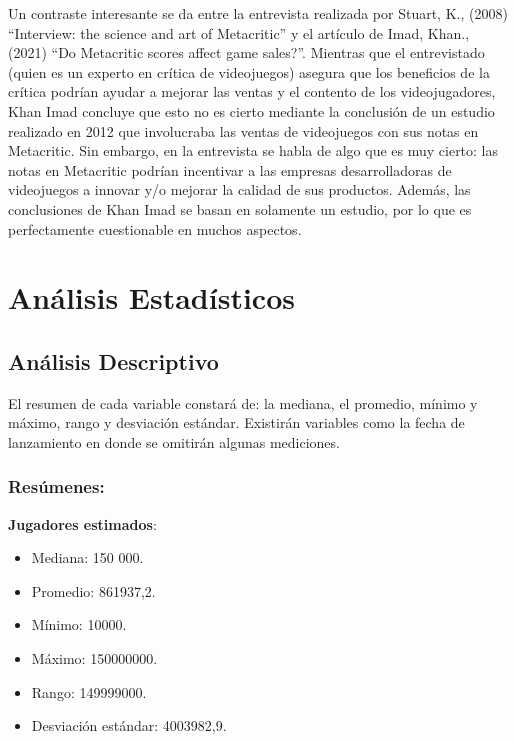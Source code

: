 \documentclass[
  letterpaper,
  DIV=11,
  numbers=noendperiod]{scrreprt}
\begin{document}
Un contraste interesante se da entre la entrevista realizada por Stuart,
K., (2008) ``Interview: the science and art of Metacritic'' y el
artículo de Imad, Khan., (2021) ``Do Metacritic scores affect game
sales?''. Mientras que el entrevistado (quien es un experto en crítica
de videojuegos) asegura que los beneficios de la crítica podrían ayudar
a mejorar las ventas y el contento de los videojugadores, Khan Imad
concluye que esto no es cierto mediante la conclusión de un estudio
realizado en 2012 que involucraba las ventas de videojuegos con sus
notas en Metacritic. Sin embargo, en la entrevista se habla de algo que
es muy cierto: las notas en Metacritic podrían incentivar a las empresas
desarrolladoras de videojuegos a innovar y/o mejorar la calidad de sus
productos. Además, las conclusiones de Khan Imad se basan en solamente
un estudio, por lo que es perfectamente cuestionable en muchos aspectos.


\hypertarget{anuxe1lisis-estaduxedsticos}{%
\chapter{Análisis Estadísticos}\label{anuxe1lisis-estaduxedsticos}}

\hypertarget{anuxe1lisis-descriptivo}{%
\section{Análisis Descriptivo}\label{anuxe1lisis-descriptivo}}

El resumen de cada variable constará de: la mediana, el promedio, mínimo
y máximo, rango y desviación estándar. Existirán variables como la fecha
de lanzamiento en donde se omitirán algunas mediciones.

\hypertarget{resuxfamenes}{%
\subsection{Resúmenes:}\label{resuxfamenes}}

\begin{tcolorbox}[enhanced jigsaw, breakable, toprule=.15mm, opacityback=0, colback=white, arc=.35mm, left=2mm, leftrule=.75mm, rightrule=.15mm, bottomrule=.15mm, colframe=quarto-callout-color-frame]

\textbf{Jugadores estimados}:

\begin{itemize}
\item
  Mediana: 150 000.
\item
  Promedio: 861937,2.
\item
  Mínimo: 10000.
\item
  Máximo: 150000000.
\item
  Rango: 149999000.
\item
  Desviación estándar: 4003982,9.
\end{itemize}

\end{tcolorbox}
\end{document}
